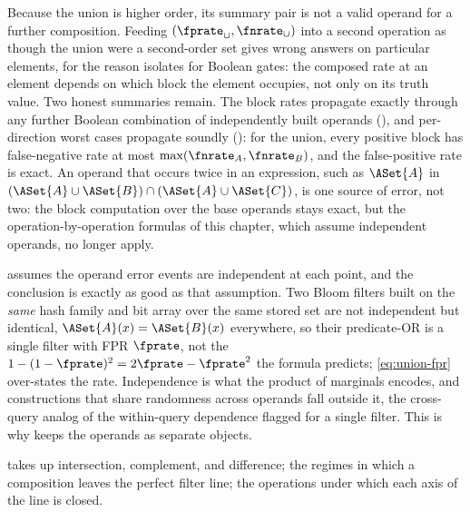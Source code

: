 \begin{remark}
\label{rem:composing-composed}
Because the union is higher order, its summary pair is not a valid operand for
a further composition. Feeding $(\fprate_\cup, \fnrate_\cup)$ into a second
operation as though the union were a second-order set gives wrong answers on
particular elements, for the reason  isolates
for Boolean gates: the composed rate at an element depends on which block the
element occupies, not only on its truth value. Two honest summaries remain.
The block rates propagate exactly through any further Boolean combination of
independently built operands
(), and per-direction worst cases propagate
soundly ():
for the union, every positive block has false-negative rate at most
$\max(\fnrate_A, \fnrate_B)$, and the false-positive rate is exact. An operand
that occurs twice in an expression, such as $\ASet{A}$ in $(\ASet{A} \cup
\ASet{B}) \cap (\ASet{A} \cup \ASet{C})$, is one source of error, not two:
the block computation over the base operands stays exact, but the
operation-by-operation formulas of this chapter, which assume independent
operands, no longer apply.
\end{remark}

\begin{remark}
\label{rem:cross-set-independence}
 assumes the operand error events are independent
at each point, and the conclusion is exactly as good as that
assumption. Two
Bloom filters built on the \emph{same} hash family and bit array over the
same stored set are not independent but identical, $\ASet{A}(x) =
\ASet{B}(x)$ everywhere, so their predicate-OR is a single filter with FPR
$\fprate$, not the $1 - (1 - \fprate)^2 = 2\fprate - \fprate^2$ the formula
predicts; \eqref{eq:union-fpr} over-states the rate. Independence is what the
product of marginals encodes, and constructions that share randomness across
operands fall outside it, the cross-query analog of the within-query
dependence  flagged for a single filter. This is
why  keeps the operands as separate objects.
\end{remark}

 takes up intersection, complement, and difference;
 the regimes in which a composition leaves the
perfect filter line;  the operations under
which each axis of the line is closed.
